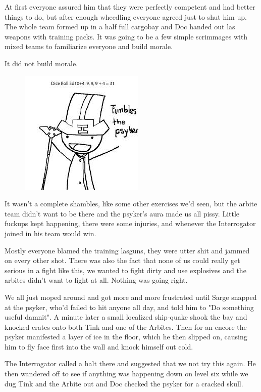 At first everyone assured him that they were perfectly competent and had better things to do, but after enough wheedling everyone agreed just to shut him up. 
The whole team formed up in a half full cargobay and Doc handed out las weapons with training packs. 
It was going to be a few simple scrimmages with mixed teams to familiarize everyone and build morale. 


It did not build morale.

\begin{figure}
	\begin{center}
		\includegraphics[width=\figwidth]{pics/9/9.png}
	\end{center}
\end{figure}
It wasn't a complete shambles, like some other exercises we'd seen, but the arbite team didn't want to be there and the psyker's aura made us all pissy. 
Little fuckups kept happening, there were some injuries, and whenever the Interrogator joined in his team would win. 


Mostly everyone blamed the training lasguns, they were utter shit and jammed on every other shot. 
There was also the fact that none of us could really get serious in a fight like this, we wanted to fight dirty and use explosives and the arbites didn't want to fight at all. 
Nothing was going right.

We all just moped around and got more and more frustrated until Sarge snapped at the psyker, who'd failed to hit anyone all day, and told him to "Do something useful damnit". 
A minute later a small localized ship-quake shook the bay and knocked crates onto both Tink and one of the Arbites. 
Then for an encore the psyker manifested a layer of ice in the floor, which he then slipped on, causing him to fly face first into the wall and knock himself out cold.

The Interrogator called a halt there and suggested that we not try this again. 
He then wandered off to see if anything was happening down on level six while we dug Tink and the Arbite out and Doc checked the psyker for a cracked skull.

